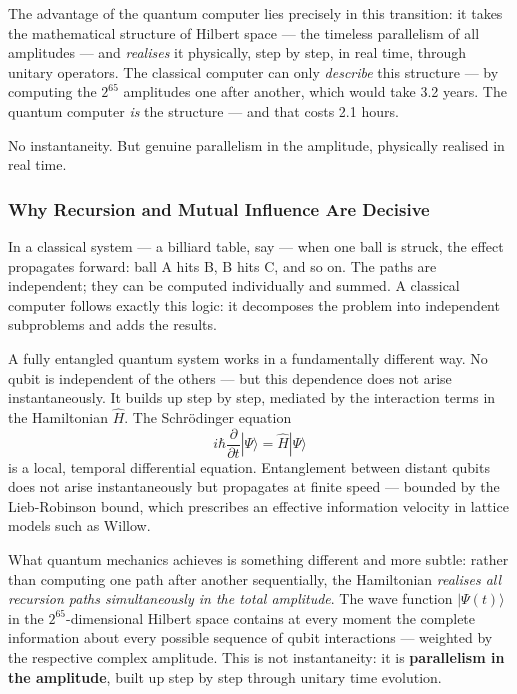 The advantage of the quantum computer lies precisely in this transition: it takes
the mathematical structure of Hilbert space — the timeless parallelism of all
amplitudes — and \emph{realises} it physically, step by step, in real time, through
unitary operators. The classical computer can only \emph{describe} this structure —
by computing the $2^{65}$ amplitudes one after another, which would take 3.2 years.
The quantum computer \emph{is} the structure — and that costs 2.1 hours.

No instantaneity. But genuine parallelism in the amplitude, physically realised
in real time.

\subsubsection*{Why Recursion and Mutual Influence Are Decisive}

In a classical system — a billiard table, say — when one ball is struck, the effect
propagates forward: ball A hits B, B hits C, and so on. The paths are independent;
they can be computed individually and summed. A classical computer follows exactly
this logic: it decomposes the problem into independent subproblems and adds the results.

A fully entangled quantum system works in a fundamentally different way.
No qubit is independent of the others — but this dependence does not arise
instantaneously. It builds up step by step, mediated by the interaction terms
in the Hamiltonian $\hat{H}$. The Schrödinger equation
\begin{equation}
    i\hbar \frac{\partial}{\partial t}|\Psi\rangle = \hat{H}|\Psi\rangle
\end{equation}
is a local, temporal differential equation. Entanglement between distant qubits
does not arise instantaneously but propagates at finite speed — bounded by the
Lieb-Robinson bound, which prescribes an effective information velocity in lattice
models such as Willow.

What quantum mechanics achieves is something different and more subtle: rather than
computing one path after another sequentially, the Hamiltonian
\emph{realises all recursion paths simultaneously in the total amplitude}. The wave
function $|\Psi(t)\rangle$ in the $2^{65}$-dimensional Hilbert space contains at
every moment the complete information about every possible sequence of qubit
interactions — weighted by the respective complex amplitude. This is not
instantaneity: it is \textbf{parallelism in the amplitude}, built up step by step
through unitary time evolution.

